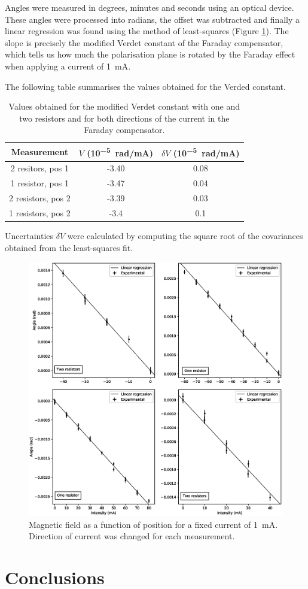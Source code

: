\documentclass[11pt,a4paper]{article}
\begin{document}
Angles were measured in degrees, minutes and seconds using an optical device. These angles were processed into radians, the offset was subtracted and finally a linear regression was found using the method of least-squares (Figure \ref{fig:FaradayAngle}). The slope is precisely the modified Verdet constant of the Faraday compensator, which tells us how much the polarisation plane is rotated by the Faraday effect when applying a current of \SI{1}{mA}.

The following table summarises the values obtained for the Verded constant.

\begin{table}[H]
\centering
\begin{tabular}{ccc}
\toprule
Measurement & $V$ (\si{10^{-5}.\radian/\mA}) & $\delta V$ (\si{10^{-5}.\radian/\mA})\\
\midrule
2 resitors, pos 1 & -3.40 & 0.08 \\
1 resistor, pos 1 & -3.47 & 0.04 \\
2 resistors, pos 2 & -3.39 & 0.03 \\
1 resistors, pos 2 & -3.4 & 0.1 \\
\bottomrule
\end{tabular}
\caption{Values obtained for the modified Verdet constant with one and two resistors and for both directions of the current in the Faraday compensator.}
\label{table:verdet}
\end{table}

Uncertainties $\delta V$ were calculated by computing the square root of the covariances obtained from the least-squares fit.

\begin{figure}[H]
\centering
\includegraphics[width=\textwidth]{Angle_diff_intensity2.eps}
\caption{Magnetic field as a function of position for a fixed current of \SI{1}{\mA}. Direction of current was changed for each measurement.}
\label{fig:FaradayAngle}
\end{figure}



\section{Conclusions}

\newpage


\end{document}
